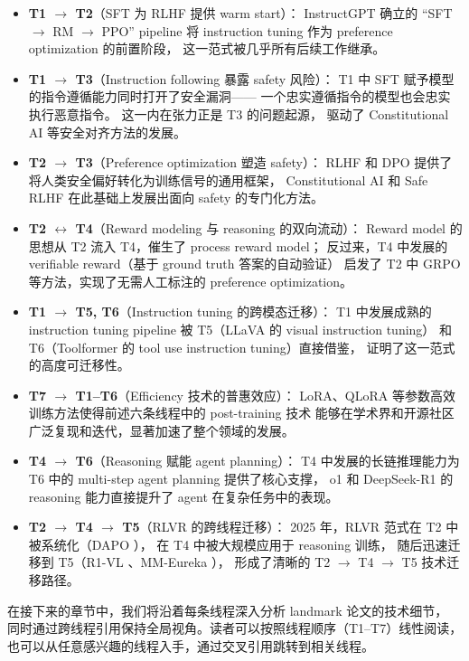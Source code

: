 \begin{itemize}[leftmargin=2em]
  \item \textbf{T1 $\rightarrow$ T2}（SFT 为 RLHF 提供 warm start）：
    InstructGPT 确立的 ``SFT $\rightarrow$ RM $\rightarrow$ PPO'' pipeline
    将 instruction tuning 作为 preference optimization 的前置阶段，
    这一范式被几乎所有后续工作继承。

  \item \textbf{T1 $\rightarrow$ T3}（Instruction following 暴露 safety 风险）：
    T1 中 SFT 赋予模型的指令遵循能力同时打开了安全漏洞——
    一个忠实遵循指令的模型也会忠实执行恶意指令。
    这一内在张力正是 T3 的问题起源，
    驱动了 Constitutional AI 等安全对齐方法的发展。

  \item \textbf{T2 $\rightarrow$ T3}（Preference optimization 塑造 safety）：
    RLHF 和 DPO 提供了将人类安全偏好转化为训练信号的通用框架，
    Constitutional AI 和 Safe RLHF 在此基础上发展出面向 safety 的专门化方法。

  \item \textbf{T2 $\leftrightarrow$ T4}（Reward modeling 与 reasoning 的双向流动）：
    Reward model 的思想从 T2 流入 T4，催生了 process reward model；
    反过来，T4 中发展的 verifiable reward（基于 ground truth 答案的自动验证）
    启发了 T2 中 GRPO 等方法，实现了无需人工标注的 preference optimization。

  \item \textbf{T1 $\rightarrow$ T5, T6}（Instruction tuning 的跨模态迁移）：
    T1 中发展成熟的 instruction tuning pipeline 被 T5（LLaVA 的 visual instruction tuning）
    和 T6（Toolformer 的 tool use instruction tuning）直接借鉴，
    证明了这一范式的高度可迁移性。

  \item \textbf{T7 $\rightarrow$ T1--T6}（Efficiency 技术的普惠效应）：
    LoRA、QLoRA 等参数高效训练方法使得前述六条线程中的 post-training 技术
    能够在学术界和开源社区广泛复现和迭代，显著加速了整个领域的发展。

  \item \textbf{T4 $\rightarrow$ T6}（Reasoning 赋能 agent planning）：
    T4 中发展的长链推理能力为 T6 中的 multi-step agent planning 提供了核心支撑，
    o1 和 DeepSeek-R1 的 reasoning 能力直接提升了 agent 在复杂任务中的表现。

  \item \textbf{T2 $\rightarrow$ T4 $\rightarrow$ T5}（RLVR 的跨线程迁移）：
    2025 年，RLVR 范式在 T2 中被系统化（DAPO \cite{yu2025dapo}），
    在 T4 中被大规模应用于 reasoning 训练，
    随后迅速迁移到 T5（R1-VL \cite{zhang2025r1vl}、MM-Eureka \cite{meng2025mmeureka}），
    形成了清晰的 T2 $\rightarrow$ T4 $\rightarrow$ T5 技术迁移路径。
\end{itemize}



\noindent
在接下来的章节中，我们将沿着每条线程深入分析 landmark 论文的技术细节，
同时通过跨线程引用保持全局视角。读者可以按照线程顺序（T1--T7）线性阅读，
也可以从任意感兴趣的线程入手，通过交叉引用跳转到相关线程。
